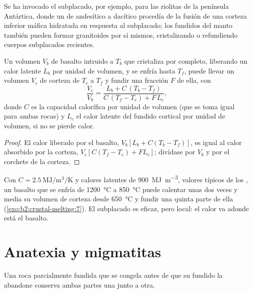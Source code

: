 Se ha invocado el subplacado, por ejemplo, para las riolitas de la península Antártica,
donde un  de andesítico a dacítico procedía de la fusión de una corteza inferior máfica hidratada en
respuesta al subplacado; los fundidos del manto también pueden formar granitoides por sí mismos,
cristalizando o refundiendo cuerpos subplacados recientes.

\begin{proposition}\label{prop:b2:crustal-melting:heat}
Un volumen $V_b$ de basalto intruido a $T_b$ que cristaliza por completo, liberando un
calor latente $L_b$ por unidad de volumen, y se enfría hasta $T_f$, puede llevar un volumen $V_c$ de corteza
de $T_c$ a $T_f$ y fundir una fracción $F$ de ella, con
\[\frac{V_c}{V_b} = \frac{L_b + C\,(T_b - T_f)}{C\,(T_f - T_c) + F\,L_c},\]
donde $C$ es la capacidad calorífica por unidad de volumen (que se toma igual para ambas rocas) y $L_c$ el
calor latente del fundido cortical por unidad de volumen, si no se pierde calor.
\end{proposition}

\begin{proof}
El calor liberado por el basalto, $V_b[L_b + C(T_b - T_f)]$, es igual al calor absorbido por
la corteza, $V_c[C(T_f - T_c) + F L_c]$; divídase por $V_b$ y por el corchete de la corteza.
\end{proof}

Con $C = \qty{2.5}{\mega\joule\per\cubic\metre\per\kelvin}$ y calores latentes de
\qty{900}{\mega\joule\per\cubic\metre}, valores típicos de los , un basalto que se enfría de
\qty{1200}{\celsius} a \qty{850}{\celsius} puede calentar unas dos veces y media su volumen
de corteza desde \qty{650}{\celsius} y fundir una quinta parte de ella (\cref{exo:b2:crustal-melting:7}).
El subplacado es eficaz, pero local: el calor va adonde está el basalto.

\section{Anatexia y migmatitas}\label{sec:b2:crustal-melting:migmatites}

Una roca parcialmente fundida que se congela antes de que su fundido la abandone conserva ambas partes una junto a otra.

